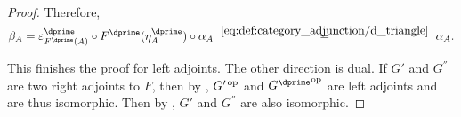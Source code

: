 \begin{proof}
  Therefore,
  \begin{equation*}
    \beta_A
    =
    \varepsilon^\dprime_{F^\dprime(A)} \bincirc F^\dprime(\eta^\dprime_A) \bincirc \alpha_A
    \reloset {\eqref{eq:def:category_adjunction/d_triangle}} =
    \alpha_A.
  \end{equation*}

  This finishes the proof for left adjoints. The other direction is \hyperref[thm:categorical_principle_of_duality]{dual}. If \( G' \) and \( G^\dprime \) are two right adjoints to \( F \), then by , \( G'^{\operatorname{op}} \) and \( {G^\dprime}^{\opcat} \) are left adjoints and are thus isomorphic. Then by , \( G' \) and \( G^\dprime \) are also isomorphic.
\end{proof}

